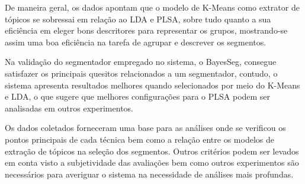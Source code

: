

De maneira geral, os dados apontam que o modelo de K-Means como extrator de tópicos se sobressai em relação ao LDA e PLSA, sobre tudo quanto a sua eficiência em eleger bons descritores para representar os grupos, mostrando-se assim uma boa eficiência na tarefa de agrupar e descrever os segmentos.

Na validação do segmentador empregado no sistema, o BayesSeg, consegue satisfazer os principais quesitos relacionados a um segmentador, contudo, o sistema apresenta resultados melhores quando selecionados por meio do K-Means e LDA, o que sugere que melhores configurações para o PLSA podem ser analisadas em outros experimentos.


Os dados coletados forneceram uma base para as análises onde se verificou os pontos principais de cada técnica bem como a relação entre os modelos de extração de tópicos na seleção dos segmentos. Outros critérios podem ser levados em conta visto a subjetividade das avaliações bem como outros experimentos são necessários para averiguar o sistema na necessidade de análises mais profundas.

